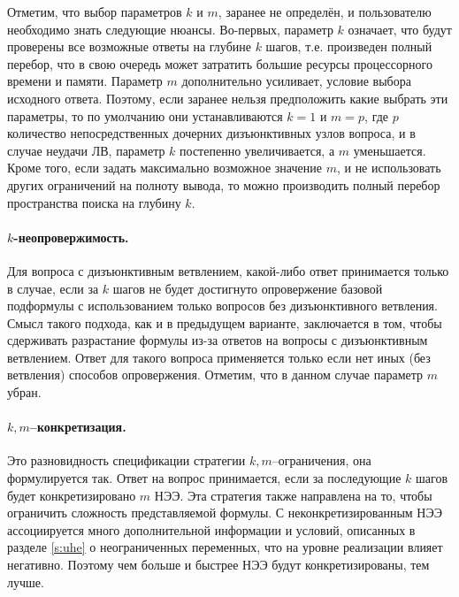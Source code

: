 Отметим, что выбор параметров $k$ и $m$, заранее не определён, и пользователю необходимо знать следующие нюансы. Во-первых, параметр $k$ означает, что будут проверены все возможные ответы на глубине $k$ шагов, т.е. произведен полный перебор, что в свою очередь может затратить большие ресурсы процессорного времени и памяти. Параметр $m$ дополнительно усиливает, условие выбора исходного ответа. Поэтому, если заранее нельзя предположить какие выбрать эти параметры, то по умолчанию они устанавливаются $k=1$ и $m=p$, где $p$ количество непосредственных дочерних дизъюнктивных узлов вопроса, и в случае неудачи ЛВ, параметр $k$ постепенно увеличивается, а $m$ уменьшается. Кроме того, если задать максимально возможное значение $m$, и не использовать других ограничений на полноту вывода, то можно производить полный перебор пространства поиска на глубину $k$.

\paragraph{$k$-неопровержимость.} Для вопроса с дизъюнктивным ветвлением, какой-либо ответ принимается только в случае, если за $k$ шагов не будет достигнуто опровержение базовой подформулы с использованием только вопросов без дизъюнктивного ветвления. Смысл такого подхода, как и в предыдущем варианте, заключается в том, чтобы сдерживать разрастание формулы из-за ответов на вопросы с дизъюнктивным ветвлением. Ответ для такого вопроса применяется только если нет иных (без ветвления) способов опровержения. Отметим, что в данном случае параметр $m$ убран.

\paragraph{$k,m$--конкретизация.} Это разновидность спецификации стратегии $k,m$--ограничения, она формулируется так. Ответ на вопрос принимается, если за последующие $k$ шагов будет конкретизировано $m$ НЭЭ. Эта стратегия также направлена на то, чтобы ограничить сложность представляемой формулы. С неконкретизированным НЭЭ ассоциируется много дополнительной информации и условий, описанных в разделе \ref{s:uhe} о неограниченных переменных, что на уровне реализации влияет негативно. Поэтому чем больше и быстрее НЭЭ будут конкретизированы, тем лучше.






